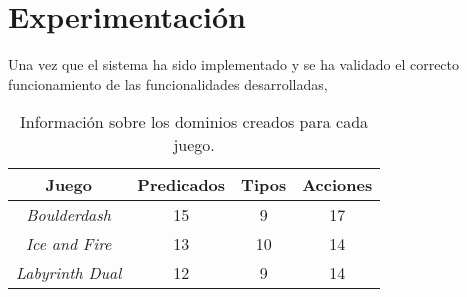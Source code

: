 
\chapter{Experimentación}

Una vez que el sistema ha sido implementado y se ha validado el correcto funcionamiento
de las funcionalidades desarrolladas,

\begin{table}[H]
\centering
\begin{tabular}{|c|ccc|}
\hline
\textbf{Juego} & \textbf{Predicados} & \textbf{Tipos} & \textbf{Acciones} \\ \hline
\textit{Boulderdash} & 15 & 9 & 17 \\ \hline
\textit{Ice and Fire} & 13 & 10 & 14 \\ \hline
\textit{Labyrinth Dual} & 12 & 9 & 14 \\ \hline
\end{tabular}
\caption{Información sobre los dominios creados para cada juego.}
\label{tab:info-domains}
\end{table}


